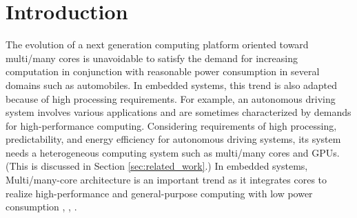 \documentclass[conference,compsoc]{IEEEtran}
\newcommand{\comment}[1]{}
\begin{document}

\vspace{-3mm}
\section{Introduction}
\vspace{-3mm}
\comment{1-4, 1-5, 1-6, 2-1, 2-4}
The evolution of a next generation computing platform oriented toward multi/many cores is unavoidable to satisfy the demand for increasing computation in conjunction with reasonable power consumption in several domains such as automobiles.
In embedded systems, this trend is also adapted because of high processing requirements.
For example, an autonomous driving system involves various applications and are sometimes characterized by demands for high-performance computing.
Considering requirements of high processing, predictability, and energy efficiency for autonomous driving systems, its system needs a heterogeneous computing system such as multi/many cores and GPUs. (This is discussed in Section \ref{sec:related_work}.)
\comment{1-3} In embedded systems, Multi/many-core architecture is an important trend as it integrates cores to realize high-performance and general-purpose computing with low power consumption \cite{becker2016contention}, \cite{faragardi2014communication}, \cite{perret2016mapping}.

\end{document}
